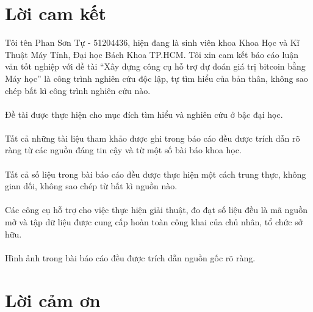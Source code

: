 \section*{Lời cam kết}
\thispagestyle{plain} 
Tôi tên Phan Sơn Tự - 51204436, hiện đang là sinh viên khoa Khoa Học và Kĩ Thuật 
Máy Tính, Đại học Bách Khoa TP.HCM. Tôi xin cam kết báo cáo luận văn tốt nghiệp với đề tài
``Xây dựng công cụ hỗ trợ dự đoán giá trị bitcoin bằng Máy học'' là công trình nghiên cứu độc lập, 
tự tìm hiểu của bản thân, không sao chép bất kì công trình nghiên cứu nào.\\\\
Đề tài được thực hiện
cho mục đích tìm hiểu và nghiên cứu ở bậc đại học.\\\\
Tất cả những tài liệu tham khảo được ghi trong báo cáo đều được trích dẫn rõ
ràng từ các nguồn đáng tin cậy và từ một số bài báo khoa học.\\\\
Tất cả số liệu trong bài báo cáo đều được thực hiện một cách trung thực,
không gian dối, không sao chép từ bất kì nguồn nào.\\\\
Các công cụ hỗ trợ cho việc thực hiện giải thuật, đo đạt số liệu đều là mã nguồn mở và tập
dữ liệu được cung cấp hoàn toàn công khai của chủ nhân, tổ chức sở hữu.\\\\
Hình ảnh trong bài báo cáo đều được trích dẫn nguồn gốc rõ ràng.
\pagebreak

\section*{Lời cảm ơn}
\thispagestyle{plain} 

